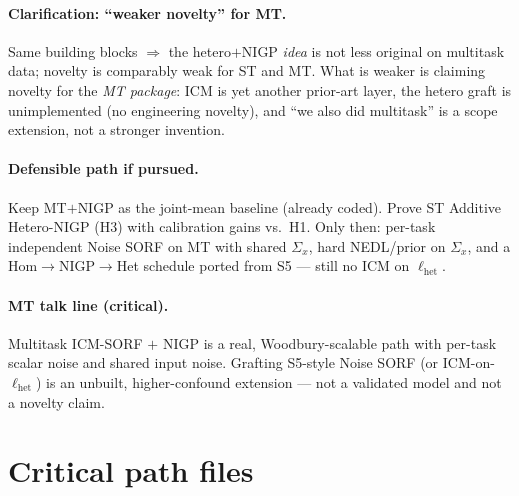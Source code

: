 \documentclass[11pt]{article}
\newcommand{\Sigx}{\Sigma_{x}}
\begin{document}
\paragraph{Clarification: ``weaker novelty'' for MT.}
Same building blocks $\Rightarrow$ the hetero$+$NIGP \emph{idea} is not less
original on multitask data; novelty is comparably weak for ST and MT.
What is weaker is claiming novelty for the \emph{MT package}: ICM is yet another
prior-art layer, the hetero graft is unimplemented (no engineering novelty), and
``we also did multitask'' is a scope extension, not a stronger invention.

\paragraph{Defensible path if pursued.}
Keep MT$+$NIGP as the joint-mean baseline (already coded).
Prove ST Additive Hetero-NIGP (H3) with calibration gains vs.\ H1.
Only then: per-task independent Noise SORF on MT with shared $\Sigx$, hard
NEDL/prior on $\Sigx$, and a Hom$\to$NIGP$\to$Het schedule ported from S5 ---
still no ICM on $\ell_{\mathrm{het}}$.

\paragraph{MT talk line (critical).}
Multitask ICM-SORF $+$ NIGP is a real, Woodbury-scalable path with per-task
scalar noise and shared input noise.
Grafting S5-style Noise SORF (or ICM-on-$\ell_{\mathrm{het}}$) is an unbuilt,
higher-confound extension --- not a validated model and not a novelty claim.

\FloatBarrier
\section{Critical path files}
\label{sec:files}
\end{document}

